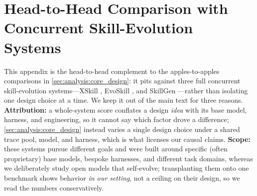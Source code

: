 \begin{table}[t]
\centering
\setlength{\tabcolsep}{4pt}
%
\caption{Broader document-agent transfer. Each row evolves an official Anthropic document skill from source traces and evaluates on a held-out target domain. Base and \systemname{} are target pass rates (\%); Gain is their difference in percentage points (pp).}
\label{tab:broader_application}
\end{table}

\section{Head-to-Head Comparison with Concurrent Skill-Evolution Systems}
\label{app:prior_systems}

This appendix is the head-to-head complement to the apples-to-apples comparisons in \cref{sec:analysis:core_design}: it pits \systemname{} against three full concurrent skill-evolution systems---XSkill \citep{jiang2026xskillcontinuallearningexperience}, EvoSkill \citep{alzubi2026evoskillautomatedskilldiscovery}, and SkillGen \citep{ma2026skillgenverifiedinferencetime}---rather than isolating one design choice at a time. We keep it out of the main text for three reasons.
\textbf{Attribution:} a whole-system score conflates a design \emph{idea} with its base model, harness, and engineering, so it cannot say which factor drove a difference; \cref{sec:analysis:core_design} instead varies a single design choice under a shared trace pool, model, and harness, which is what licenses our causal claims.
\textbf{Scope:} these systems pursue different goals and were built around specific (often proprietary) base models, bespoke harnesses, and different task domains, whereas we deliberately study open models that self-evolve; transplanting them onto one benchmark shows behavior \emph{in our setting}, not a ceiling on their design, so we read the numbers conservatively.

